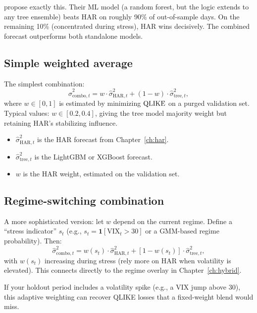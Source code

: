 \citet{RahimikiaPoon2020} propose exactly this.  Their ML model (a
random forest, but the logic extends to any tree ensemble) beats HAR on
roughly 90\% of out-of-sample days.  On the remaining 10\% (concentrated
during stress), HAR wins decisively.  The combined forecast outperforms both
standalone models.

\subsection*{Simple weighted average}

The simplest combination:
\begin{equation}\label{eq:trees:combo}
  \hat{\sigma}^2_{\text{combo},t}
  = w \cdot \hat{\sigma}^2_{\text{HAR},t}
  + (1-w) \cdot \hat{\sigma}^2_{\text{tree},t},
\end{equation}
where $w \in [0,1]$ is estimated by minimizing $\operatorname{QLIKE}$ on a purged
validation set.  Typical values: $w \in [0.2, 0.4]$, giving the tree model
majority weight but retaining HAR's stabilizing influence.

\begin{itemize}[leftmargin=1.8em]
  \item $\hat{\sigma}^2_{\text{HAR},t}$ is the HAR forecast from
        Chapter~\ref{ch:har}.
  \item $\hat{\sigma}^2_{\text{tree},t}$ is the LightGBM or XGBoost
        forecast.
  \item $w$ is the HAR weight, estimated on the validation set.
\end{itemize}

\subsection*{Regime-switching combination}

A more sophisticated version: let $w$ depend on the current regime.  Define
a ``stress indicator'' $s_t$ (e.g., $s_t = \mathbf{1}[\text{VIX}_t > 30]$ or
a GMM-based regime probability).  Then:
\begin{equation}\label{eq:trees:regime_combo}
  \hat{\sigma}^2_{\text{combo},t}
  = w(s_t) \cdot \hat{\sigma}^2_{\text{HAR},t}
  + [1 - w(s_t)] \cdot \hat{\sigma}^2_{\text{tree},t},
\end{equation}
with $w(s_t)$ increasing during stress (rely more on HAR when volatility is
elevated).  This connects directly to the regime overlay in
Chapter~\ref{ch:hybrid}.

\begin{projectconnection}
If your holdout period includes a volatility
spike (e.g., a VIX jump above 30), this adaptive weighting can recover
QLIKE losses that a fixed-weight blend would miss.
\end{projectconnection}

